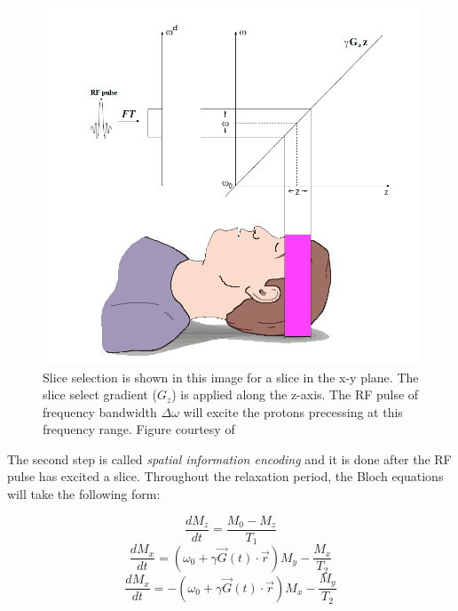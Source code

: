 \begin{figure}[ht]
    \centering
    \includegraphics[width=1\textwidth,keepaspectratio]{sliceselect}
    \caption{Slice selection is shown in this image for a slice in the x-y plane. The slice select gradient ($G_z$) is applied along the z-axis. The RF pulse of frequency bandwidth $\Delta \omega$ will excite the protons precessing at this frequency range. Figure courtesy of \cite{Drobnjak07}}
    \label{fig:sliceselect}
\end{figure}

The second step is called \textit{spatial information encoding} and it is done after the RF pulse has excited a slice. Throughout the relaxation period, the Bloch equations will take the following form:

\begin{equation} \label{eq:258}
    \frac{dM_z}{dt} = \frac{M_0 - M_z}{T_1}
\end{equation}
\begin{equation} \label{eq:259}
    \frac{dM_x}{dt} = ( \omega_0 + \gamma \vec{G}(t) \cdot \vec{r} ) M_y - \frac{M_x}{T_2}
\end{equation}
\begin{equation} \label{eq:260}
    \frac{dM_x}{dt} = - (\omega_0 + \gamma \vec{G}(t) \cdot \vec{r}) M_x - \frac{M_y}{T_2}
\end{equation}

